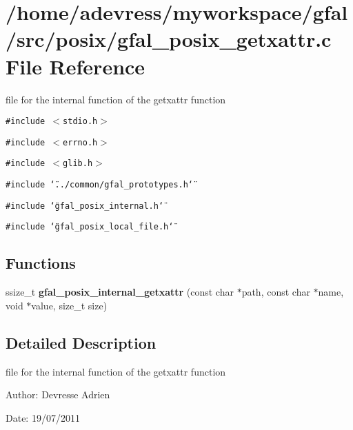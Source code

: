 \section{/home/adevress/myworkspace/gfal/src/posix/gfal\_\-posix\_\-getxattr.c File Reference}
\label{gfal__posix__getxattr_8c}
file for the internal function of the getxattr function 

{\tt \#include $<$stdio.h$>$}\par
{\tt \#include $<$errno.h$>$}\par
{\tt \#include $<$glib.h$>$}\par
{\tt \#include \char`\"{}../common/gfal\_\-prototypes.h\char`\"{}}\par
{\tt \#include \char`\"{}gfal\_\-posix\_\-internal.h\char`\"{}}\par
{\tt \#include \char`\"{}gfal\_\-posix\_\-local\_\-file.h\char`\"{}}\par
\subsection*{Functions}
\begin{CompactItemize}
\item 
ssize\_\-t \textbf{gfal\_\-posix\_\-internal\_\-getxattr} (const char $\ast$path, const char $\ast$name, void $\ast$value, size\_\-t size)\label{gfal__posix__getxattr_8c_ca798d7e3e0e14d6992669e7c125347f}

\end{CompactItemize}


\subsection{Detailed Description}
file for the internal function of the getxattr function 

\begin{Desc}
\item[Author:]Devresse Adrien \end{Desc}
\begin{Desc}
\item[Date:]19/07/2011 \end{Desc}
